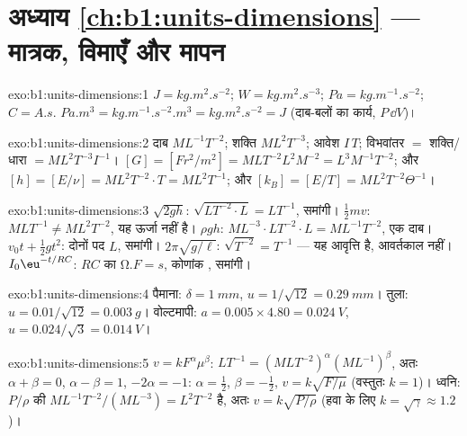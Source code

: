 \section*{अध्याय \ref{ch:b1:units-dimensions} --- मात्रक, विमाएँ और मापन}

\begin{solution}{exo:b1:units-dimensions:1}
$\unit{J} = \unit{kg.m^2.s^{-2}}$; $\unit{W} = \unit{kg.m^2.s^{-3}}$;
$\unit{Pa} = \unit{kg.m^{-1}.s^{-2}}$; $\unit{C} = \unit{A.s}$.
$\unit{Pa.m^3} = \unit{kg.m^{-1}.s^{-2}.m^3} = \unit{kg.m^2.s^{-2}} = \unit{J}$
(दाब-बलों का कार्य, $P\,\dd V$)।
\end{solution}

\begin{solution}{exo:b1:units-dimensions:2}
दाब $M L^{-1} T^{-2}$; शक्ति $M L^2 T^{-3}$; आवेश $I\,T$;
विभवांतर $=$ शक्ति/धारा $= M L^2 T^{-3} I^{-1}$।
$[G] = [F r^2/m^2] = M L T^{-2} L^2 M^{-2} = L^3 M^{-1} T^{-2}$;
और $[h] = [E/\nu] = M L^2 T^{-2} \cdot T = M L^2 T^{-1}$;
और $[k_B] = [E/T] = M L^2 T^{-2} \Theta^{-1}$।
\end{solution}

\begin{solution}{exo:b1:units-dimensions:3}
$\sqrt{2gh}$: $\sqrt{L T^{-2} \cdot L} = L T^{-1}$, समांगी।
$\tfrac12 mv$: $M L T^{-1} \neq M L^2 T^{-2}$, यह ऊर्जा नहीं है।
$\rho g h$: $M L^{-3} \cdot L T^{-2} \cdot L = M L^{-1} T^{-2}$, एक दाब।
$v_0 t + \tfrac12 g t^2$: दोनों पद $L$, समांगी।
$2\pi\sqrt{g/\ell}$: $\sqrt{T^{-2}} = T^{-1}$ --- यह आवृत्ति है, आवर्तकाल नहीं।
$I_0\eu^{-t/RC}$: $RC$ का  $\unit{\ohm.F} = \unit{s}$, कोणांक , समांगी।
\end{solution}

\begin{solution}{exo:b1:units-dimensions:4}
पैमाना: $\delta = \qty{1}{mm}$, $u = 1/\sqrt{12} = \qty{0.29}{mm}$।
तुला: $u = 0.01/\sqrt{12} = \qty{0.003}{g}$।
वोल्टमापी: $a = 0.005 \times 4.80 = \qty{0.024}{V}$,
$u = 0.024/\sqrt3 = \qty{0.014}{V}$।
\end{solution}

\begin{solution}{exo:b1:units-dimensions:5}
$v = k F^\alpha \mu^\beta$: $L T^{-1} = (M L T^{-2})^\alpha (M L^{-1})^\beta$,
अतः $\alpha + \beta = 0$, $\alpha - \beta = 1$, $-2\alpha = -1$:
$\alpha = \tfrac12$, $\beta = -\tfrac12$, $v = k\sqrt{F/\mu}$ (वस्तुतः $k = 1$)।
ध्वनि: $P/\rho$ की  $M L^{-1} T^{-2} / (M L^{-3}) = L^2 T^{-2}$ है,
अतः $v = k\sqrt{P/\rho}$ (हवा के लिए $k = \sqrt\gamma \approx 1.2$)।
\end{solution}

